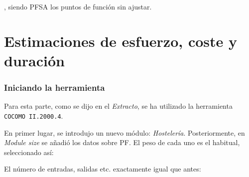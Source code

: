 \documentclass[spanish,a4paper,11pt, twoside]{report}	%
\begin{document}
	, siendo PFSA los puntos de función sin ajustar.
	

\newpage
\mbox{}
\thispagestyle{empty}						%
\newpage
\setcounter{section}{0}

\part{Estimaciones de esfuerzo, coste y duración} %
\section{Iniciando la herramienta}
Para esta parte, como se dijo en el \textit{Extracto}, se ha utilizado la herramienta \texttt{COCOMO II.2000.4}.

En primer lugar, se introdujo un nuevo módulo: \textit{Hostelería}. Posteriormente, en \textit{Module size} se añadió los datos sobre PF. El peso de cada uno es el habitual, seleccionado así:

\vspace{0.35cm}
\hspace{3.5cm}
\vspace{0.35cm}

El número de entradas, salidas etc. exactamente igual que antes:
\end{document}
